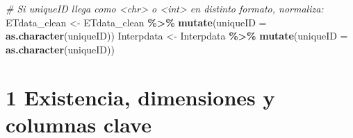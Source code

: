 \documentclass[
]{article}
\newenvironment{Shaded}{\begin{snugshade}}{\end{snugshade}}
\newcommand{\AttributeTok}[1]{\textcolor[rgb]{0.13,0.29,0.53}{#1}}
\newcommand{\CommentTok}[1]{\textcolor[rgb]{0.56,0.35,0.01}{\textit{#1}}}
\newcommand{\FunctionTok}[1]{\textcolor[rgb]{0.13,0.29,0.53}{\textbf{#1}}}
\newcommand{\NormalTok}[1]{#1}
\newcommand{\OtherTok}[1]{\textcolor[rgb]{0.56,0.35,0.01}{#1}}
\newcommand{\SpecialCharTok}[1]{\textcolor[rgb]{0.81,0.36,0.00}{\textbf{#1}}}
\begin{document}
\begin{Shaded}
\begin{Highlighting}[]
\CommentTok{\# Si uniqueID llega como \textless{}chr\textgreater{} o \textless{}int\textgreater{} en distinto formato, normaliza:}
\NormalTok{ETdata\_clean }\OtherTok{\textless{}{-}}\NormalTok{ ETdata\_clean }\SpecialCharTok{\%\textgreater{}\%} \FunctionTok{mutate}\NormalTok{(}\AttributeTok{uniqueID =} \FunctionTok{as.character}\NormalTok{(uniqueID))}
\NormalTok{Interpdata   }\OtherTok{\textless{}{-}}\NormalTok{ Interpdata   }\SpecialCharTok{\%\textgreater{}\%} \FunctionTok{mutate}\NormalTok{(}\AttributeTok{uniqueID =} \FunctionTok{as.character}\NormalTok{(uniqueID))}
\end{Highlighting}
\end{Shaded}

\section{1 Existencia, dimensiones y columnas
clave}\label{existencia-dimensiones-y-columnas-clave}
\end{document}
